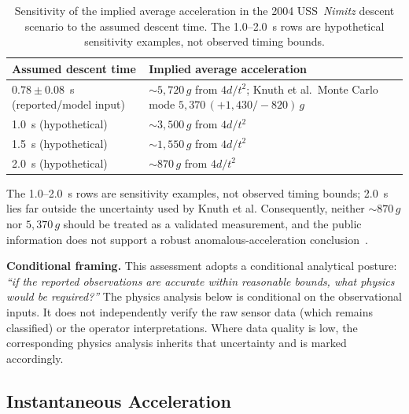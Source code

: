 \documentclass[aps,prd,twocolumn,superscriptaddress,nofootinbib,floatfix]{revtex4-2}
\begin{document}
\begin{table}[tb]
\caption{Sensitivity of the implied average acceleration in the 2004
USS~\textit{Nimitz} descent scenario to the assumed descent time. The
1.0--2.0~s rows are hypothetical sensitivity examples, not observed timing
bounds.}
\label{tab:nimitz-sensitivity}
\begin{tabular}{@{}ll@{}}
\toprule
\parbox[t]{0.36\columnwidth}{\strut Assumed descent time\strut} & \parbox[t]{0.56\columnwidth}{\strut Implied average acceleration\strut} \\
\midrule
\parbox[t]{0.36\columnwidth}{\strut $0.78\pm0.08$~s (reported/model input)\strut} & \parbox[t]{0.56\columnwidth}{\strut ${\sim}5{,}720\,g$ from $4d/t^{2}$;
  Knuth et al.\ Monte Carlo mode $5{,}370\,(+1{,}430/{-}820)\,g$\strut} \\
\parbox[t]{0.36\columnwidth}{\strut 1.0~s (hypothetical)\strut} & \parbox[t]{0.56\columnwidth}{\strut ${\sim}3{,}500\,g$ from $4d/t^{2}$\strut} \\
\parbox[t]{0.36\columnwidth}{\strut 1.5~s (hypothetical)\strut} & \parbox[t]{0.56\columnwidth}{\strut ${\sim}1{,}550\,g$ from $4d/t^{2}$\strut} \\
\parbox[t]{0.36\columnwidth}{\strut 2.0~s (hypothetical)\strut} & \parbox[t]{0.56\columnwidth}{\strut ${\sim}870\,g$ from $4d/t^{2}$\strut} \\
\bottomrule
\end{tabular}
\end{table}

The 1.0--2.0~s rows are sensitivity examples, not observed timing bounds;
\SI{2.0}{s} lies far outside the uncertainty used by Knuth et al. Consequently,
neither ${\sim}870\,g$ nor $5{,}370\,g$ should be treated as a validated
measurement, and the public information does not support a robust
anomalous-acceleration conclusion~\cite{Knuth2019}.

\textbf{Conditional framing.} This assessment adopts a conditional analytical
posture: \emph{``if the reported observations are accurate within reasonable
bounds, what physics would be required?''} The physics analysis below is
conditional on the observational inputs. It does not independently verify the raw
sensor data (which remains classified) or the operator interpretations. Where data
quality is low, the corresponding physics analysis inherits that uncertainty and
is marked accordingly.

\subsection{Instantaneous Acceleration}\label{sec:acceleration}
\end{document}
